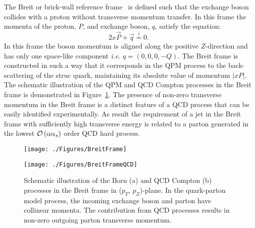 The Breit or brick-wall reference frame~\cite{feynman:1972:photon,zfp:c2:237} is defined such that the exchange boson collides with a proton without transverse momentum transfer. In this frame the momenta of the proton, $P$, and exchange boson, $q$, satisfy the equation:
\begin{equation}
2x\vec{P} + \vec{q} \stackrel{!}{=} 0.
\label{eq:breitframe}
\end{equation}
In this frame the boson momentum is aligned along the positive $Z$-direction and has only one space-like component \textit{i.e.} $q=\left( 0, 0, 0, -Q\right)$. The Breit frame is constructed in such a way that it corresponds in the QPM process to the back-scattering of the struc quark, maintaining its absolute value of momentum $\left|xP\right|$. The schematic illustration of the QPM and QCD Compton processes in the Breit frame is demonstrated in Figure~\ref{fig:breitframe}. The presence of non-zero transverse momentum in the Breit frame is a distinct feature of a QCD process that can be easily identified experimentally. As result the requirement of a jet in the Breit frame with sufficiently high transverse energy is related to a parton generated in the lowest $\mathcal{O}\left(\alpha\mbox{$\alpha_{s}$}\right)$ order QCD hard process.
\begin{figure}
	\centering
	\begin{subfloat}[]{
		\texttt{[image: ./Figures/BreitFrame]}
		\label{fig:breitframeqpm}
	}%
	\end{subfloat}
	\begin{subfloat}[]{
		\texttt{[image: ./Figures/BreitFrameQCD]}
		\label{fig:breitframeqcd}
	}%
	\end{subfloat}
	\caption{Schematic illustration of the Born (a) and QCD Compton (b) processes in the Breit frame in ($p_T$, $p_Z$)-plane. In the quark-parton model process, the incoming exchange boson and parton have collinear momenta. The contribution from QCD processes results in non-zero outgoing parton transverse momentum.}
\label{fig:breitframe}
\end{figure}